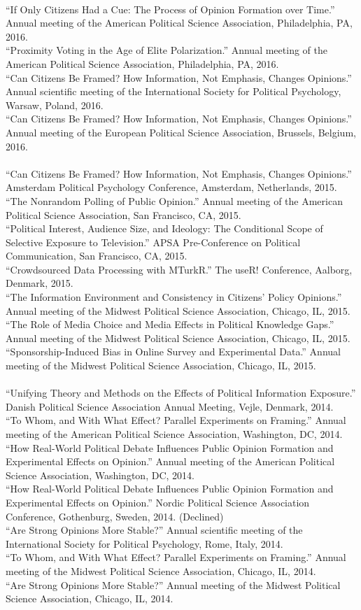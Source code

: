 \documentclass[12pt]{article}
\newcommand{\topic}[1]{\pagebreak[3]\indent {\color{lg}{\footnotesize #1 }}\\}
\newcommand{\entry}[1]{\indent {\color{lg}\guillemotright}\hspace{2pt}#1\vspace{.25em}\\}
\begin{document}
    \topic{Conference Papers (2016)}
	\entry{``If Only Citizens Had a Cue: The Process of Opinion Formation over Time.'' Annual meeting of the American Political Science Association, Philadelphia, PA, 2016.}
	\entry{``Proximity Voting in the Age of Elite Polarization.'' Annual meeting of the American Political Science Association, Philadelphia, PA, 2016.}
	\entry{``Can Citizens Be Framed? How Information, Not Emphasis, Changes Opinions.'' Annual scientific meeting of the International Society for Political Psychology, Warsaw, Poland, 2016.}
	\entry{``Can Citizens Be Framed? How Information, Not Emphasis, Changes Opinions.'' Annual meeting of the European Political Science Association, Brussels, Belgium, 2016.}
	
	\topic{Conference Papers (2015)}
	\entry{``Can Citizens Be Framed? How Information, Not Emphasis, Changes Opinions.'' Amsterdam Political Psychology Conference, Amsterdam, Netherlands, 2015.}
	\entry{``The Nonrandom Polling of Public Opinion.'' Annual meeting of the American Political Science Association, San Francisco, CA, 2015.}
	\entry{``Political Interest, Audience Size, and Ideology: The Conditional Scope of Selective Exposure to Television.'' APSA Pre-Conference on Political Communication, San Francisco, CA, 2015.}
	\entry{``Crowdsourced Data Processing with MTurkR.'' The useR! Conference, Aalborg, Denmark, 2015.}
	\entry{``The Information Environment and Consistency in Citizens' Policy Opinions.'' Annual meeting of the Midwest Political Science Association, Chicago, IL, 2015.}
	\entry{``The Role of Media Choice and Media Effects in Political Knowledge Gaps.'' Annual meeting of the Midwest Political Science Association, Chicago, IL, 2015.}
	\entry{``Sponsorship-Induced Bias in Online Survey and Experimental Data.'' Annual meeting of the Midwest Political Science Association, Chicago, IL, 2015.}
	
	\topic{Conference Papers (2014)}
	\entry{``Unifying Theory and Methods on the Effects of Political Information Exposure.'' Danish Political Science Association Annual Meeting, Vejle, Denmark, 2014.}
	\entry{``To Whom, and With What Effect? Parallel Experiments on Framing.'' Annual meeting of the American Political Science Association, Washington, DC, 2014.}
	\entry{``How Real-World Political Debate Influences Public Opinion Formation and Experimental Effects on Opinion.'' Annual meeting of the American Political Science Association, Washington, DC, 2014.}
	\entry{``How Real-World Political Debate Influences Public Opinion Formation and Experimental Effects on Opinion.'' Nordic Political Science Association Conference, Gothenburg, Sweden, 2014. (Declined)}
	\entry{``Are Strong Opinions More Stable?'' Annual scientific meeting of the International Society for Political Psychology, Rome, Italy, 2014.}
	\entry{``To Whom, and With What Effect? Parallel Experiments on Framing.'' Annual meeting of the Midwest Political Science Association, Chicago, IL, 2014.}
	\entry{``Are Strong Opinions More Stable?'' Annual meeting of the Midwest Political Science Association, Chicago, IL, 2014.}
	
\end{document}
